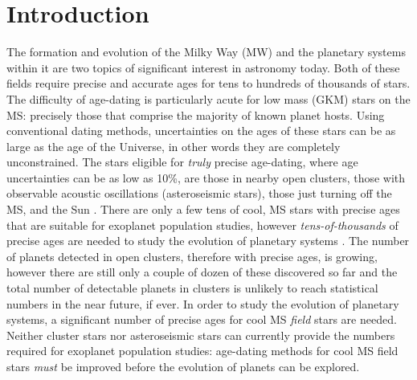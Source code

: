 \section{Introduction}
\label{section:intro}

The formation and evolution of the Milky Way (MW) and the planetary systems
within it are two topics of significant interest in astronomy today.
Both of these fields require precise and accurate ages for tens to hundreds of
thousands of stars.
The difficulty of age-dating is particularly acute for low mass (GKM) stars on
the MS: precisely those that comprise the majority of known planet hosts.
Using conventional dating methods, uncertainties on the ages of these stars
can be as large as the age of the Universe, in other words they are completely
unconstrained.
The stars eligible for {\it truly} precise age-dating, where age uncertainties
can be as low as 10\%, are those in nearby open clusters, those with
observable acoustic oscillations (asteroseismic stars), those just turning off
the MS, and the Sun
\citep[see][for a review of stellar ages]{soderblom2010}.
There are only a few tens of cool, MS stars with precise ages that are
suitable for exoplanet population studies, however {\it tens-of-thousands} of
precise ages are needed to study the evolution of planetary systems
\citep[\eg][]{petigura2013, foreman-mackey2014, veras2015, burke2015}.
The number of planets detected in open clusters, therefore with precise ages,
is growing, however there are still only a couple of dozen of these discovered
so far and the total number of detectable planets in clusters is unlikely to
reach statistical numbers in the near future, if ever.
In order to study the evolution of planetary systems, a significant number of
precise ages for cool MS {\it field} stars are needed.
Neither cluster stars nor asteroseismic stars can currently provide the
numbers required for exoplanet population studies: age-dating methods for cool
MS field stars {\it must} be improved before the evolution of planets can be
explored.

